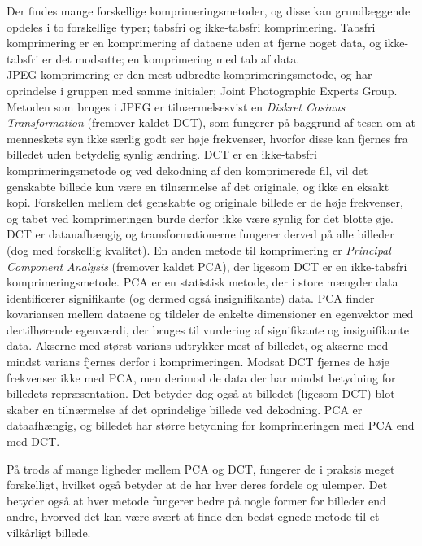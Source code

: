 Der findes mange forskellige komprimeringsmetoder, og disse kan grundlæggende opdeles i to forskellige typer; tabsfri og ikke-tabsfri komprimering. Tabsfri komprimering er en komprimering af dataene uden at fjerne noget data, og ikke-tabsfri er det modsatte; en komprimering med tab af data.\\
JPEG-komprimering er den mest udbredte komprimeringsmetode, og har oprindelse i gruppen med samme initialer; Joint Photographic Experts Group. Metoden som bruges i JPEG er tilnærmelsesvist en \emph{Diskret Cosinus Transformation} (fremover kaldet DCT), som fungerer på baggrund af tesen om at menneskets syn ikke særlig godt ser høje frekvenser, hvorfor disse kan fjernes fra billedet uden betydelig synlig ændring. DCT er en ikke-tabsfri komprimeringsmetode og ved dekodning af den komprimerede fil, vil det genskabte billede kun være en tilnærmelse af det originale, og ikke en eksakt kopi. Forskellen mellem det genskabte og originale billede er de høje frekvenser, og tabet ved komprimeringen burde derfor ikke være synlig for det blotte øje. DCT er datauafhængig og transformationerne fungerer derved på alle billeder (dog med forskellig kvalitet).
En anden metode til komprimering er \emph{Principal Component Analysis} (fremover kaldet PCA), der ligesom DCT er en ikke-tabsfri komprimeringsmetode. PCA er en statistisk metode, der i store mængder data identificerer signifikante (og dermed også insignifikante) data. PCA finder kovariansen mellem dataene og tildeler de enkelte dimensioner en egenvektor med dertilhørende egenværdi, der bruges til vurdering af signifikante og insignifikante data. Akserne med størst varians udtrykker mest af billedet, og akserne med mindst varians fjernes derfor i komprimeringen. Modsat DCT fjernes de høje frekvenser ikke med PCA, men derimod de data der har mindst betydning for billedets repræsentation. Det betyder dog også at billedet (ligesom DCT) blot skaber en tilnærmelse af det oprindelige billede ved dekodning. PCA er dataafhængig, og billedet har større betydning for komprimeringen med PCA end med DCT.

På trods af mange ligheder mellem PCA og DCT, fungerer de i praksis meget forskelligt, hvilket også betyder at de har hver deres fordele og ulemper. Det betyder også at hver metode fungerer bedre på nogle former for billeder end andre, hvorved det kan være svært at finde den bedst egnede metode til et vilkårligt billede.


